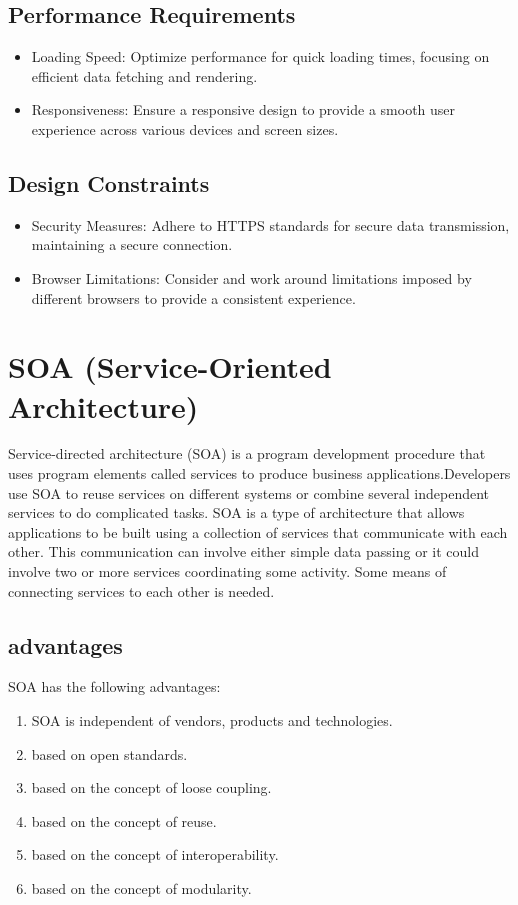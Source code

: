 \documentclass[12pt,a4paper, twosite]{article}
\begin{document}
\subsection{Performance Requirements}
\label{sec:org94bc543}

\begin{itemize}
  \item Loading Speed: Optimize performance for quick loading times, focusing on efficient data fetching and rendering.
  \item  Responsiveness: Ensure a responsive design to provide a smooth user experience across various devices and screen sizes.

\end{itemize}


\subsection{Design Constraints}
\label{sec:org49fe900}

\begin{itemize}
  \item Security Measures: Adhere to HTTPS standards for secure data transmission, maintaining a secure connection.
  \item Browser Limitations: Consider and work around limitations imposed by different browsers to provide a consistent experience.

\end{itemize}


\section{SOA (Service-Oriented Architecture)}
\label{sec:org40573d1}

Service-directed architecture (SOA) is a program development procedure that uses program elements called services to produce business applications.Developers use SOA to reuse services on different systems or combine several independent services to do complicated tasks. SOA is a type of architecture that allows applications to be built using a collection of services that communicate with each other. This communication can involve either simple data passing or it could involve two or more services coordinating some activity. Some means of connecting services to each other is needed.

\subsection{advantages}
\label{sec:orgb8b6b9e}
SOA has the following advantages:
\begin{enumerate}
\item SOA is independent of vendors, products and technologies.
\item based on open standards.
\item based on the concept of loose coupling.
\item based on the concept of reuse.
\item based on the concept of interoperability.
\item based on the concept of modularity.
\end{enumerate}
\end{document}
